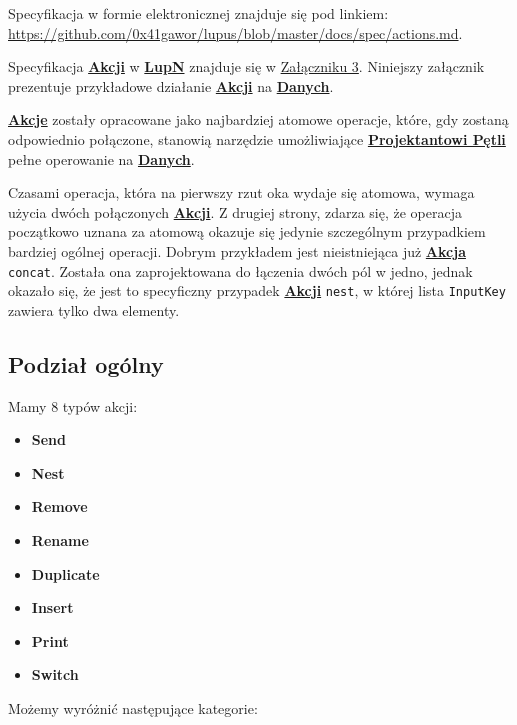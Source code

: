 \label{appendix:6}

Specyfikacja w formie elektronicznej znajduje się pod linkiem: \url{https://github.com/0x41gawor/lupus/blob/master/docs/spec/actions.md}.

Specyfikacja \hyperlink{def:akcja}{\textbf{Akcji}} w \hyperlink{def:lupn}{\textbf{LupN}} znajduje się w \hyperref[appendix:3]{Załączniku 3}. Niniejszy załącznik prezentuje przykładowe działanie \hyperlink{def:akcja}{\textbf{Akcji}} na \hyperlink{def:dane}{\textbf{Danych}}.

\hyperlink{def:akcja}{\textbf{Akcje}} zostały opracowane jako najbardziej atomowe operacje, które, gdy zostaną odpowiednio połączone, stanowią narzędzie umożliwiające \hyperlink{def:projektant}{\textbf{Projektantowi Pętli}} pełne operowanie na \hyperlink{def:dane}{\textbf{Danych}}.

Czasami operacja, która na pierwszy rzut oka wydaje się atomowa, wymaga użycia dwóch połączonych \hyperlink{def:akcja}{\textbf{Akcji}}. Z drugiej strony, zdarza się, że operacja początkowo uznana za atomową okazuje się jedynie szczególnym przypadkiem bardziej ogólnej operacji. Dobrym przykładem jest nieistniejąca już \hyperlink{def:akcja}{\textbf{Akcja}} \texttt{concat}. Została ona zaprojektowana do łączenia dwóch pól w jedno, jednak okazało się, że jest to specyficzny przypadek \hyperlink{def:akcja}{\textbf{Akcji}} \texttt{nest}, w której lista \texttt{InputKey} zawiera tylko dwa elementy.

\subsection{Podział ogólny}

Mamy 8 typów akcji:

\begin{itemize}
    \item \textbf{Send}
    \item \textbf{Nest}
    \item \textbf{Remove}
    \item \textbf{Rename}
    \item \textbf{Duplicate}
    \item \textbf{Insert}
    \item \textbf{Print}
    \item \textbf{Switch}
\end{itemize}

Możemy wyróżnić następujące kategorie:

